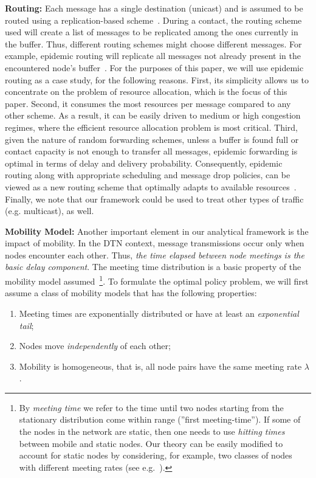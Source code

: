 \textbf{Routing:} Each message has a single destination (unicast) and is assumed to be routed using a replication-based scheme~\cite{akis:ton-multi}. During a contact, the routing scheme used will create a list of messages to be replicated among the ones currently in the buffer. Thus, different routing schemes might choose different messages. For example, epidemic routing will replicate all messages not already present in the encountered node's buffer~\cite{Vahdat:epidemic}. For the purposes of this paper, we will use epidemic routing as a case study, for the following reasons. First, its simplicity allows us to concentrate on the problem of resource allocation, which is the focus of this paper. Second, it consumes the most resources per message compared to any other scheme. As a result, it can be easily driven to medium or high congestion regimes, where the efficient resource allocation problem is most critical. Third, given the nature of random forwarding schemes, unless a buffer is found full or contact capacity is not enough to transfer all messages, epidemic forwarding is optimal in terms of delay and delivery probability. Consequently, epidemic routing along with appropriate scheduling and message drop policies, can be viewed as a new routing scheme that optimally adapts to available resources~\cite{Levine:Sigcomm07}. Finally, we note that our framework could be used to treat other types of traffic (e.g. multicast), as well. %

\textbf{Mobility Model:} Another important element in our analytical framework is the impact of mobility. In the DTN context, message transmissions occur only when nodes encounter each other. Thus, \emph{the time elapsed between node meetings is the basic delay component}. The meeting time
distribution is a basic property of the mobility model
assumed~\cite{akis:mobihoc06,Inria:MessageDelay}\footnote{By \emph{meeting time} we refer to the time until two nodes starting from the stationary distribution come within range (''first meeting-time''). If some of the nodes in the network are static, then one needs to use \emph{hitting times} between mobile and static nodes. Our theory can be easily
modified to account for static nodes by considering, for example, two classes of nodes with different meeting rates (see e.g.~\cite{akis09}).}. To formulate the optimal policy problem, we will first assume a class of mobility models that has the following properties:
\begin{enumerate}
\item [A.1] Meeting times are exponentially distributed or have at least an \emph{exponential tail};
\item [A.2] Nodes move \emph{independently} of each other;
\item [A.3] Mobility is homogeneous, that is, all node pairs have the same meeting rate $\lambda$.
\end{enumerate}

